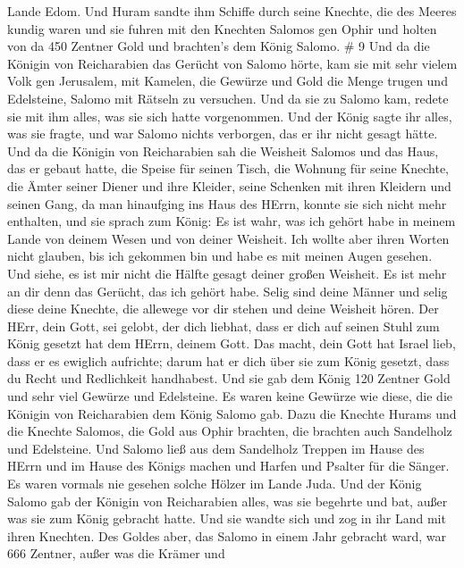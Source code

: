 Lande Edom.  Und Huram sandte ihm Schiffe durch seine
Knechte, die des Meeres kundig waren und sie fuhren mit den Knechten
Salomos gen Ophir und holten von da 450 Zentner Gold und brachten's dem
König Salomo. \# 9  Und da die Königin von Reicharabien das
Gerücht von Salomo hörte, kam sie mit sehr vielem Volk gen Jerusalem,
mit Kamelen, die Gewürze und Gold die Menge trugen und Edelsteine,
Salomo mit Rätseln zu versuchen. Und da sie zu Salomo kam, redete sie
mit ihm alles, was sie sich hatte vorgenommen.  Und der
König sagte ihr alles, was sie fragte, und war Salomo nichts verborgen,
das er ihr nicht gesagt hätte.  Und da die Königin von
Reicharabien sah die Weisheit Salomos und das Haus, das er gebaut hatte,
 die Speise für seinen Tisch, die Wohnung für seine Knechte,
die Ämter seiner Diener und ihre Kleider, seine Schenken mit ihren
Kleidern und seinen Gang, da man hinaufging ins Haus des HErrn, konnte
sie sich nicht mehr enthalten,  und sie sprach zum König: Es
ist wahr, was ich gehört habe in meinem Lande von deinem Wesen und von
deiner Weisheit.  Ich wollte aber ihren Worten nicht
glauben, bis ich gekommen bin und habe es mit meinen Augen gesehen. Und
siehe, es ist mir nicht die Hälfte gesagt deiner großen Weisheit. Es ist
mehr an dir denn das Gerücht, das ich gehört habe.  Selig
sind deine Männer und selig diese deine Knechte, die allewege vor dir
stehen und deine Weisheit hören.  Der HErr, dein Gott, sei
gelobt, der dich liebhat, dass er dich auf seinen Stuhl zum König
gesetzt hat dem HErrn, deinem Gott. Das macht, dein Gott hat Israel
lieb, dass er es ewiglich aufrichte; darum hat er dich über sie zum
König gesetzt, dass du Recht und Redlichkeit handhabest. 
Und sie gab dem König 120 Zentner Gold und sehr viel Gewürze und
Edelsteine. Es waren keine Gewürze wie diese, die die Königin von
Reicharabien dem König Salomo gab.  Dazu die Knechte Hurams
und die Knechte Salomos, die Gold aus Ophir brachten, die brachten auch
Sandelholz und Edelsteine.  Und Salomo ließ aus dem
Sandelholz Treppen im Hause des HErrn und im Hause des Königs machen und
Harfen und Psalter für die Sänger. Es waren vormals nie gesehen solche
Hölzer im Lande Juda.  Und der König Salomo gab der Königin
von Reicharabien alles, was sie begehrte und bat, außer was sie zum
König gebracht hatte. Und sie wandte sich und zog in ihr Land mit ihren
Knechten.  Des Goldes aber, das Salomo in einem Jahr
gebracht ward, war 666 Zentner,  außer was die Krämer und
